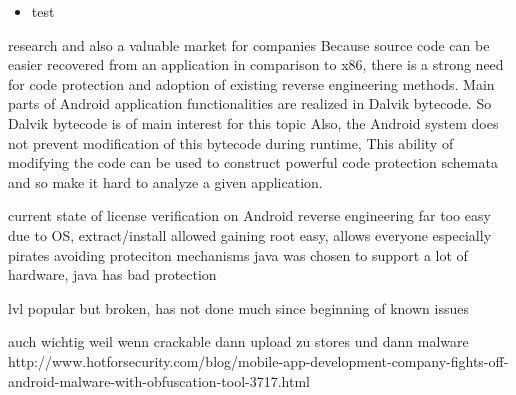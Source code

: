 \begin{itemize}
    \item test
\end{itemize}

research and also a valuable market for companies\newline
Because source code can be easier recovered from an application in comparison
to x86, there is a strong need for code protection and adoption of existing reverse engineering methods. Main parts of Android application functionalities are realized in Dalvik bytecode. So Dalvik bytecode is of main interest for this topic\newline
Also, the Android system does not prevent modification of this bytecode during runtime, This ability of modifying the code can be used to construct
powerful code protection schemata and so make it hard to analyze a given application.\newline
\cite{schulzLabCourse}
%



%
current state of license verification  on Android
reverse engineering far too easy due to OS, extract/install allowed
gaining root easy, allows everyone especially pirates avoiding proteciton mechanisms
java was chosen to support a lot of hardware, java has bad protection

lvl popular but broken, has not done much since beginning of known issues
\cite{munteanLicense}
%

auch wichtig weil wenn crackable dann upload zu stores und dann malware \newline
http://www.hotforsecurity.com/blog/mobile-app-development-company-fights-off-android-malware-with-obfuscation-tool-3717.html\newline
